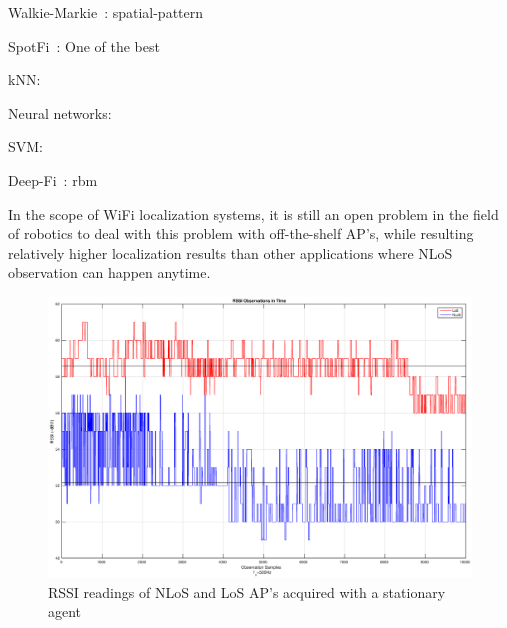     Walkie-Markie~\cite{shen2013walkie}: spatial-pattern


    SpotFi~\cite{kotaru2015spotfi}: One of the best



    kNN:~\cite{liu2007survey}



    Neural networks:~\cite{dayekh2010cooperative}


    SVM:~\cite{wu2007location}


    Deep-Fi~\cite{wang2016csi}: \gls{rbm}


    In the scope of WiFi localization systems, it is still an open problem in the field of robotics to deal with this problem with off-the-shelf AP's, while resulting relatively higher localization results than other applications where NLoS observation can happen anytime.

    \begin{figure}[thpb]
       \centering
       \includegraphics[width=\linewitdh]{figures/rssi_variance.eps}
       \caption{\label{fig:variance}RSSI readings of NLoS and LoS AP's acquired with a stationary agent}
    \end{figure}


